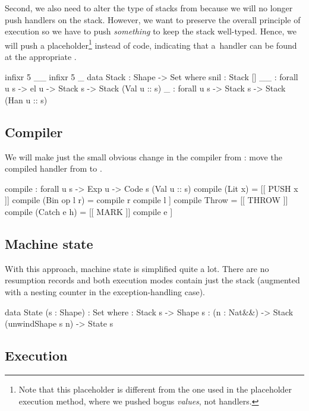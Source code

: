 Second, we also need to alter the type of stacks from 
because we will no longer push handlers on the stack. However, we want to
preserve the overall principle of execution so we have to push \emph{something}
to keep the stack well-typed.  Hence, we will push a placeholder\footnote{ Note
that this placeholder is different from the one used in the placeholder
execution method, where we pushed bogus \emph{values}, not handlers.} instead
of code, indicating that a~handler can be found at the appropriate
.

\begin{code}
  infixr 5 _\scons\_
  infixr 5 \void\sconsh\_
  data Stack : Shape -> Set where
    snil : Stack []
    _\scons\_ : forall {u s} -> el u -> Stack s -> Stack (Val u :: s)
    \void\sconsh\_ : forall {u s} -> Stack s -> Stack (Han u :: s)
\end{code}

\subsection{Compiler}

We will make just the small obvious change in the compiler from
: move the compiled handler from  to .

\label{sec:hau-compile}\begin{code}
compile : forall {u s} -> Exp u -> Code s (Val u :: s)
compile (Lit x) = [[ PUSH x ]]
compile (Bin op l r) = compile r \app compile l \app [[ opInstr op ]] 
compile Throw = [[ THROW ]]
compile (Catch e h) = [[ MARK ]] \app compile e \app [[ UNMARK (compile h) ]]
\end{code}

\subsection{Machine state}

With this approach, machine state is simplified quite a lot. There are no
resumption records and both execution modes contain just the stack (augmented
with a nesting counter in the exception-handling case).

\begin{code}
  data State (s : Shape) : Set where
    \tick[_] : Stack s -> Shape s
    \x[_,_] : (n : Nat&\!&) -> Stack (unwindShape s n) -> State s
\end{code}

\subsection{Execution}

